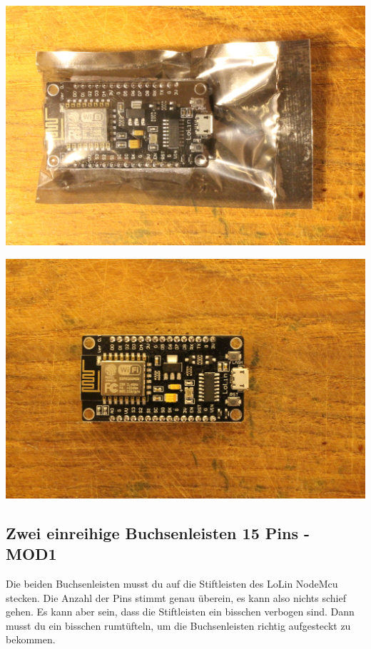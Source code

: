 \documentclass{article}
\begin{document}
\begin{minipage}[b]{0.5\textwidth}
	\includegraphics[width=\textwidth]{Bilder2019/IMG_6451.JPG}
\end{minipage}
\begin{minipage}[b]{0.5\textwidth}
	\includegraphics[width=\textwidth]{Bilder2019/IMG_6452.JPG}
\end{minipage}

\subsection{Zwei einreihige Buchsenleisten 15 Pins - MOD1}
Die beiden Buchsenleisten musst du auf die Stiftleisten des LoLin NodeMcu stecken. Die Anzahl der Pins stimmt genau überein, es kann also nichts schief gehen. Es kann aber sein, dass die Stiftleisten ein bisschen verbogen sind. Dann musst du ein bisschen rumtüfteln, um die Buchsenleisten richtig aufgesteckt zu bekommen.
\end{document}
